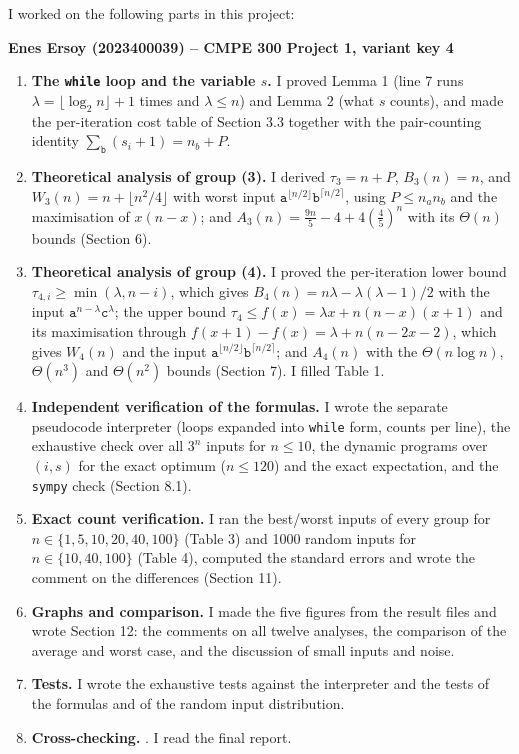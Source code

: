 

\draftbanner
I worked on the following parts in this project:

\textbf{Enes Ersoy (2023400039) -- CMPE 300 Project 1, variant key 4}

\begin{enumerate}[leftmargin=1.5em]
\item \textbf{The \texttt{while} loop and the variable $s$.} I proved Lemma 1 (line 7 runs
$\lambda=\lfloor\log_2 n\rfloor+1$ times and $\lambda\le n$) and Lemma 2 (what $s$ counts), and made the per-iteration
cost table of Section 3.3 together with the pair-counting identity $\sum_{\texttt{b}}(s_i+1)=n_b+P$.
\item \textbf{Theoretical analysis of group (3).} I derived $\tau_3=n+P$, $B_3(n)=n$, and
$W_3(n)=n+\lfloor n^2/4\rfloor$ with worst input $\texttt{a}^{\lfloor n/2\rfloor}\texttt{b}^{\lceil n/2\rceil}$, using
$P\le n_an_b$ and the maximisation of $x(n-x)$; and $A_3(n)=\frac{9n}{5}-4+4(\frac45)^n$ with its $\Theta(n)$ bounds
(Section 6).
\item \textbf{Theoretical analysis of group (4).} I proved the per-iteration lower bound
$\tau_{4,i}\ge\min(\lambda,n-i)$, which gives $B_4(n)=n\lambda-\lambda(\lambda-1)/2$ with the input
$\texttt{a}^{n-\lambda}\texttt{c}^{\lambda}$; the upper bound $\tau_4\le f(x)=\lambda x+n(n-x)(x+1)$ and its
maximisation through $f(x+1)-f(x)=\lambda+n(n-2x-2)$, which gives $W_4(n)$ and the input
$\texttt{a}^{\lfloor n/2\rfloor}\texttt{b}^{\lceil n/2\rceil}$; and $A_4(n)$ with the $\Theta(n\log n)$, $\Theta(n^3)$
and $\Theta(n^2)$ bounds (Section 7). I filled Table 1.
\item \textbf{Independent verification of the formulas.} I wrote the separate pseudocode interpreter (loops expanded
into \texttt{while} form, counts per line), the exhaustive check over all $3^n$ inputs for $n\le10$, the dynamic
programs over $(i,s)$ for the exact optimum ($n\le120$) and the exact expectation, and the \texttt{sympy} check
(Section 8.1).
\item \textbf{Exact count verification.} I ran the best/worst inputs of every group for
$n\in\{1,5,10,20,40,100\}$ (Table 3) and 1000 random inputs for $n\in\{10,40,100\}$ (Table 4), computed the
standard errors and wrote the comment on the differences (Section 11).
\item \textbf{Graphs and comparison.} I made the five figures from the result files and wrote Section 12: the comments
on all twelve analyses, the comparison of the average and worst case, and the discussion of small inputs and noise.
\item \textbf{Tests.} I wrote the exhaustive tests against the interpreter and the tests of the formulas and of the
random input distribution.
\item \textbf{Cross-checking.} . I read the final report.
\end{enumerate}

